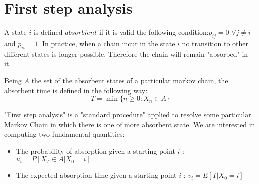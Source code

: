 \section{First step analysis}
\begin{definition}
	 A state $i$ is defined $absorbient$ if it is valid the following condition:$p_{ij}=0$ $\forall j\neq i$ and $p_{ii}=1$. In practice, when a chain incur in the state $i$ no transition to other different states is longer possible. Therefore  the chain will remain "absorbed" in it. 
\end{definition}
\begin{definition}
	Being $A$ the set of the absorbent states of a particular markov chain, the absorbent time is defined in the following way: 
	\begin{equation}
	T= \min \{n\geq0: X_n \in A \}
	\end{equation}
\end{definition}
"First step analysis" is a "standard procedure" applied to resolve some particular Markov Chain in which there is one of more absorbent state.
 We are interested in computing two fundamental quantities:
\begin{itemize}
	\item The probability of absorption given a starting point $i$ :  $ u_i=P[X_T\in A | X_0=i ]$
	\item The expected absorption time given a starting point $i$ : $v_i= E[T|X_0=i]$
\end{itemize}
